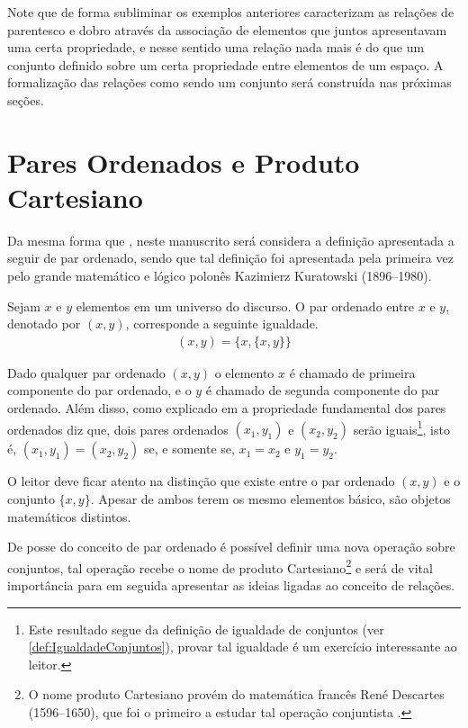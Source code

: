 Note que de forma subliminar os exemplos anteriores caracterizam as relações de parentesco e dobro através da associação de elementos que juntos apresentavam uma certa propriedade, e nesse sentido uma relação nada mais é do que um conjunto definido sobre um certa propriedade entre elementos de um espaço. A formalização das relações como sendo um conjunto será construída nas próximas seções.

\section{Pares Ordenados e Produto Cartesiano}\label{sec:ParesOrdenadoEProduto}

Da mesma forma que \cite{abe1991-TC}, neste manuscrito será considera a definição apresentada a seguir de par ordenado, sendo que tal definição foi apresentada pela primeira vez pelo grande matemático e lógico polonês Kazimierz Kuratowski (1896--1980).

\begin{definition}\label{def:ParOrdenado}
	Sejam $x$ e $y$ elementos em um universo do discurso. O par ordenado entre $x$ e $y$, denotado por $(x, y)$, corresponde a seguinte igualdade.
	\begin{eqnarray*}
		(x, y) = \{x, \{x, y\}\}
	\end{eqnarray*}
\end{definition}

Dado qualquer par ordenado $(x,y)$ o elemento $x$ é chamado de primeira componente do par ordenado, e o $y$ é chamado de segunda componente do par ordenado. Além disso, como explicado em \cite{lipschutz2013-MD, lipschutz1978-TC} a propriedade fundamental dos pares ordenados diz que, dois pares ordenados $(x_1, y_1)$ e $(x_2, y_2)$ serão iguais\footnote{Este resultado  segue da definição de igualdade de conjuntos (ver \ref{def:IgualdadeConjuntos}), provar tal igualdade é um exercício interessante ao leitor.},  isto é, $(x_1, y_1) = (x_2, y_2)$ se, e somente se, $x_1 = x_2$ e $y_1 = y_2$.

\begin{rema}
	O leitor deve ficar atento na distinção que existe entre o par ordenado $(x,y)$ e o conjunto $\{x, y\}$. Apesar de ambos terem os mesmo elementos básico, são objetos matemáticos distintos.
\end{rema}

De posse do conceito de par ordenado é possível definir uma nova operação sobre conjuntos, tal operação recebe o nome de produto Cartesiano\footnote{O nome produto Cartesiano provém do matemática francês René Descartes (1596--1650), que foi o primeiro a estudar tal operação conjuntista \cite{lipschutz1978-TC}.} e será de vital importância para em seguida apresentar as ideias ligadas ao conceito de relações.

